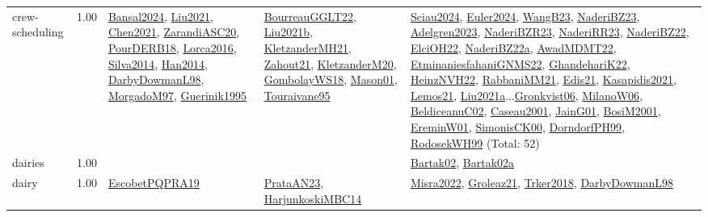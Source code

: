 {\begin{longtable}{p{3cm}r>{\raggedright\arraybackslash}p{6cm}>{\raggedright\arraybackslash}p{6cm}>{\raggedright\arraybackslash}p{8cm}}
\index{crew-scheduling}\index{ApplicationAreas!crew-scheduling}crew-scheduling &  1.00 & \hyperref[detail:Bansal2024]{Bansal2024}, \hyperref[detail:Liu2021]{Liu2021}, \hyperref[detail:Chen2021]{Chen2021}, \hyperref[detail:ZarandiASC20]{ZarandiASC20}, \hyperref[detail:PourDERB18]{PourDERB18}, \hyperref[detail:Lorca2016]{Lorca2016}, \hyperref[detail:Silva2014]{Silva2014}, \hyperref[detail:Han2014]{Han2014}, \hyperref[detail:DarbyDowmanL98]{DarbyDowmanL98}, \hyperref[detail:MorgadoM97]{MorgadoM97}, \hyperref[detail:Guerinik1995]{Guerinik1995} & \hyperref[detail:BourreauGGLT22]{BourreauGGLT22}, \hyperref[detail:Liu2021b]{Liu2021b}, \hyperref[detail:KletzanderMH21]{KletzanderMH21}, \hyperref[detail:Zahout21]{Zahout21}, \hyperref[detail:KletzanderM20]{KletzanderM20}, \hyperref[detail:GombolayWS18]{GombolayWS18}, \hyperref[detail:Mason01]{Mason01}, \hyperref[detail:Touraivane95]{Touraivane95} & \hyperref[detail:Sciau2024]{Sciau2024}, \hyperref[detail:Euler2024]{Euler2024}, \hyperref[detail:WangB23]{WangB23}, \hyperref[detail:NaderiBZ23]{NaderiBZ23}, \hyperref[detail:Adelgren2023]{Adelgren2023}, \hyperref[detail:NaderiBZR23]{NaderiBZR23}, \hyperref[detail:NaderiRR23]{NaderiRR23}, \hyperref[detail:NaderiBZ22]{NaderiBZ22}, \hyperref[detail:ElciOH22]{ElciOH22}, \hyperref[detail:NaderiBZ22a]{NaderiBZ22a}, \hyperref[detail:AwadMDMT22]{AwadMDMT22}, \hyperref[detail:EtminaniesfahaniGNMS22]{EtminaniesfahaniGNMS22}, \hyperref[detail:GhandehariK22]{GhandehariK22}, \hyperref[detail:HeinzNVH22]{HeinzNVH22}, \hyperref[detail:RabbaniMM21]{RabbaniMM21}, \hyperref[detail:Edis21]{Edis21}, \hyperref[detail:Kasapidis2021]{Kasapidis2021}, \hyperref[detail:Lemos21]{Lemos21}, \hyperref[detail:Liu2021a]{Liu2021a}...\hyperref[detail:Gronkvist06]{Gronkvist06}, \hyperref[detail:MilanoW06]{MilanoW06}, \hyperref[detail:BeldiceanuC02]{BeldiceanuC02}, \hyperref[detail:Caseau2001]{Caseau2001}, \hyperref[detail:JainG01]{JainG01}, \hyperref[detail:BosiM2001]{BosiM2001}, \hyperref[detail:EreminW01]{EreminW01}, \hyperref[detail:SimonisCK00]{SimonisCK00}, \hyperref[detail:DorndorfPH99]{DorndorfPH99}, \hyperref[detail:RodosekWH99]{RodosekWH99} (Total: 52)\\
\index{dairies}\index{ApplicationAreas!dairies}dairies &  1.00 &  &  & \hyperref[detail:Bartak02]{Bartak02}, \hyperref[detail:Bartak02a]{Bartak02a}\\
\index{dairy}\index{ApplicationAreas!dairy}dairy &  1.00 & \hyperref[detail:EscobetPQPRA19]{EscobetPQPRA19} & \hyperref[detail:PrataAN23]{PrataAN23}, \hyperref[detail:HarjunkoskiMBC14]{HarjunkoskiMBC14} & \hyperref[detail:Misra2022]{Misra2022}, \hyperref[detail:Groleaz21]{Groleaz21}, \hyperref[detail:Trker2018]{Trker2018}, \hyperref[detail:DarbyDowmanL98]{DarbyDowmanL98}\\

\end{longtable}}

